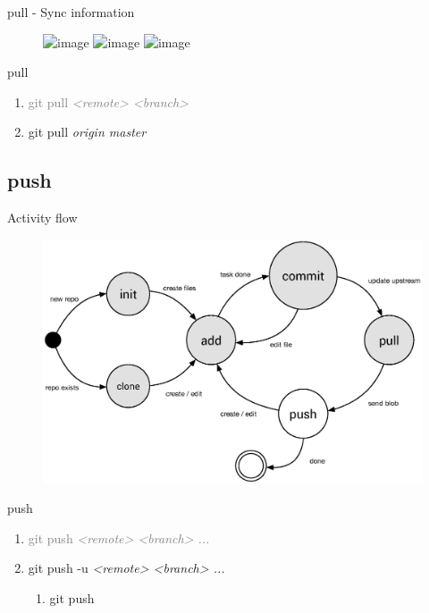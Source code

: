 \documentclass{beamer}
\begin{document}
\begin{frame}{pull - Sync information}
    \begin{figure}
        \center
        \includegraphics<1>[width=.8\textwidth]{git-pull-contents-1}
        \includegraphics<2>[width=.8\textwidth]{git-pull-contents-2}
        \includegraphics<3>[width=.8\textwidth]{git-pull-contents-3}
        \label{fig:git-pull-contents}
    \end{figure}
\end{frame}

\begin{frame}{pull}
    \Large{
        \begin{enumerate}[\$]
            \item<1-> \textcolor<2->{gray}{git pull \em{<remote>} \em{<branch>}}
            \item<2-> git pull \em{origin} \em{master}
        \end{enumerate}
    }
\end{frame}

\subsection{push}
\begin{frame}{Activity flow}
    \begin{figure}
        \center
        \includegraphics[width=.9\textwidth]{git-command-flow-4}
        \label{fig:git-command-flow-4}
    \end{figure}
\end{frame}

\begin{frame}{push}
    \begin{enumerate}[\$]
        \item<1-> \textcolor<2->{gray}{git push \em{<remote>} \em{<branch>} ...}
        \item<2-> git push -u \em{<remote>} \em{<branch>} ...
        \begin{enumerate}[-]
            \item<3-> git push 
        \end{enumerate}
    \end{enumerate}
\end{frame}
\end{document}

